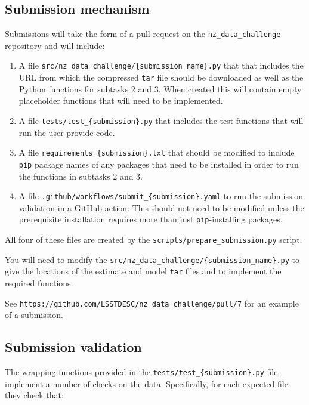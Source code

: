 \documentclass[11pt,twoside,letterpaper,onecolumn,english]{article}
\begin{document}
\subsection{Submission mechanism}

Submissions will take the form of a pull request on the
\texttt{nz\_data\_challenge} repository and will include:

\begin{enumerate}
\item{A file \texttt{src/nz\_data\_challenge/\{submission\_name\}.py} that
    that includes the URL from which the compressed \texttt{tar} file should be downloaded
    as well as the Python functions for subtasks 2 and 3.    When
    created this will contain empty placeholder functions that will
    need to be implemented.}
 \item{A file \texttt{tests/test\_\{submission\}.py}  that includes the
    test functions that will run the user provide code.}
 \item{A file \texttt{requirements\_\{submission\}.txt} that should
     be modified to include \texttt{pip} package names of any
     packages that need to be installed in order to run the
     functions in subtasks 2 and 3.}     
 \item{A file \texttt{.github/workflows/submit\_\{submission\}.yaml} to
     run the submission validation in a GitHub action.  This should
     not need to be modified unless the prerequisite installation
     requires more than just \texttt{pip}-installing packages.}
\end{enumerate}

All four of these files are created by the
\texttt{scripts/prepare\_submission.py} script.

You will need to modify the \texttt{src/nz\_data\_challenge/\{submission\_name\}.py} to
give the locations of the estimate and model \texttt{tar} files
and to implement the required functions.

See \texttt{https://github.com/LSSTDESC/nz\_data\_challenge/pull/7}
for an example of a submission.


\subsection{Submission validation}

The wrapping functions provided in the \texttt{tests/test\_\{submission\}.py}
file implement a number of \allowbreak checks on the data. Specifically, for each
expected file they check that:
\end{document}
